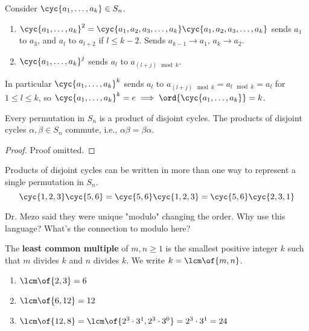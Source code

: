 \begin{example}
     Consider $\cyc{a_1,\dots,a_k} \in S_n$.
     \begin{enumerate}
        \item $\cyc{a_1,\dots,a_k}^2 = \cyc{a_1,a_2,a_3,\dots,a_k}\cyc{a_1,a_2,a_3,\dots,a_k}$ sends $a_1$ to $a_3$, and $a_l$ to $a_{l+2}$ if $l \leq k - 2$. Sends $a_{k-1} \to a_1$, $a_{k} \to a_2$.
        \item $\cyc{a_1,\dots,a_k}^j$ sends $a_l$ to $a_{(l + j) \mod k}$.
     \end{enumerate}
     In particular $\cyc{a_1,\dots,a_k}^k$ sends $a_l$ to $a_{(l+j) \mod k} = a_{l \mod k} = a_l$ for $1 \leq l \leq k$, so $\cyc{a_1,\dots,a_k}^k = e \implies \ord{\cyc{a_1,\dots,a_k}} = k$.
\end{example}

\begin{theorem}
    Every permutation in $S_n$ is a product of disjoint cycles. The products of disjoint cycles $\alpha, \beta \in S_n$ commute, i.e., $\alpha\beta = \beta\alpha$.
\end{theorem}
\begin{proof}
    Proof omitted.
\end{proof}

\begin{remark}
    Products of disjoint cycles can be written in more than one way to represent a single permutation in $S_n$.
    \[\cyc{1,2,3}\cyc{5,6} = \cyc{5,6}\cyc{1,2,3} = \cyc{5,6}\cyc{2,3,1}\]
\end{remark}

\begin{question}
    Dr. Mezo said they were unique "modulo" changing the order. Why use this language? What's the connection to modulo here?
\end{question}

\begin{definition}
    The \textbf{least common multiple} of $m,n \geq 1$ is the smallest positive integer $k$ such that $m$ divides $k$ and $n$ divides $k$. We write $k = \lcm\of{m,n}$.
\end{definition}

\begin{example}
    \spacebeforelist
    \begin{enumerate}
        \item $\lcm\of{2,3} = 6$
        \item $\lcm\of{6,12} = 12$
        \item $\lcm\of{12,8} = \lcm\of{2^3 \cdot 3^1, 2^3 \cdot 3^0} = 2^3 \cdot 3^1 = 24$
    \end{enumerate}
\end{example}

